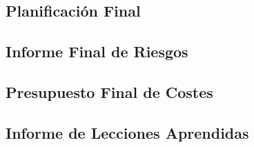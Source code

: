 \subsection{Planificación Final}

\subsection{Informe Final de Riesgos}

\subsection{Presupuesto Final de Costes}

\subsection{Informe de Lecciones Aprendidas}

